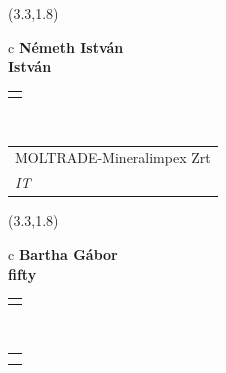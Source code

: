 \documentclass[11pt]{article}
\begin{document}
\makebox(3.3,1.8){
  \renewcommand\arraystretch{1.3}
  \begin{tabular}[c]{c}
    \hspace{8.5mm}
    \LARGE\bf{ Németh István }\\
    \hspace{8.5mm}
    \Large{ István }\\
    \renewcommand\arraystretch{3}
    \begin{tabular}[c]{c}
      \centering
      \fontfamily{phv}\selectfont{
        \textbf{
          \textsc{
            \scriptsize{
            \color{Dark}{ Ismerkedő }\color{Bright}{ Webmester }\color{Bright}{ Sminkmester }\color{Bright}{ Programozó }
            }
          }
        }
      }
    \end{tabular}
    \\
    \renewcommand\arraystretch{1}
    \begin{tabular}{p{3.3in}}
      \hspace{.7cm}MOLTRADE-Mineralimpex Zrt\\
      \hspace{.7cm}\emph{ IT }\\
    \end{tabular}
  \end{tabular}
}

\makebox(3.3,1.8){
  \renewcommand\arraystretch{1.3}
  \begin{tabular}[c]{c}
    \hspace{8.5mm}
    \LARGE\bf{ Bartha Gábor }\\
    \hspace{8.5mm}
    \Large{ fifty }\\
    \renewcommand\arraystretch{3}
    \begin{tabular}[c]{c}
      \centering
      \fontfamily{phv}\selectfont{
        \textbf{
          \textsc{
            \scriptsize{
            \color{Bright}{ Ismerkedő }\color{Bright}{ Webmester }\color{Bright}{ Sminkmester }\color{Dark}{ Programozó }
            }
          }
        }
      }
    \end{tabular}
    \\
    \renewcommand\arraystretch{1}
    \begin{tabular}{p{3.3in}}
      \hspace{.7cm}\\
      \hspace{.7cm}\emph{  }\\
    \end{tabular}
  \end{tabular}
}
\end{document}
